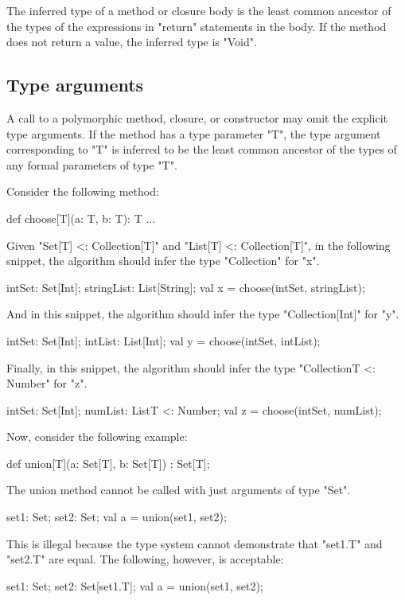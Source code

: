 The inferred type of a method or closure body is the least common ancestor
of the types of the expressions in \xcd"return" statements
in the body.  If the method does not return a value, the
inferred type is \xcd"Void".

\subsection{Type arguments}

A call to a polymorphic method, closure, or constructor may omit the
explicit type arguments.  If the method has a type parameter
\xcd"T", the type argument corresponding to \xcd"T" is inferred
to be the least common ancestor of the types of any formal
parameters of type \xcd"T".

Consider the following method:
\begin{xten}
def choose[T](a: T, b: T): T { ... }
\end{xten}
%
Given \xcd"Set[T] <: Collection[T]"
and \xcd"List[T] <: Collection[T]",
in the following snippet, the algorithm should infer the type
\xcd"Collection" for \xcd"x".
\begin{xten}
intSet: Set[Int];
stringList: List[String];
val x = choose(intSet, stringList);
\end{xten}
%
And in this snippet, the algorithm should infer the type
\xcd"Collection[Int]" for \xcd"y".
\begin{xten}
intSet: Set[Int];
intList: List[Int];
val y = choose(intSet, intList);
\end{xten}
%
Finally, in this snippet, the algorithm should infer the type
\xcd"Collection{T <: Number}" for \xcd"z".
\begin{xten}
intSet: Set[Int];
numList: List{T <: Number};
val z = choose(intSet, numList);
\end{xten}

Now, consider the following example:
\begin{xten}
def union[T](a: Set[T], b: Set[T]) : Set[T];
\end{xten}
The union method cannot be called with just arguments of type \xcd"Set".
\begin{xten}
set1: Set;
set2: Set;
val a = union(set1, set2);
\end{xten}
This is illegal because the type system cannot demonstrate that
\xcd"set1.T" and \xcd"set2.T" are equal.
The following, however, is acceptable:
\begin{xten}
set1: Set;
set2: Set[set1.T];
val a = union(set1, set2);
\end{xten}

